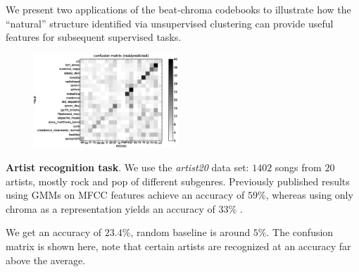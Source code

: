 \documentclass[landscape,a0b,final]{a0poster}
\newenvironment{poster}{
  \begin{center}
  \begin{minipage}[c]{0.98\textwidth}
}{
  \end{minipage} 
  \end{center}
}
\newcommand{\pbox}[4]{
\psshadowbox[#3]{
\begin{minipage}[t][#2][t]{#1}
#4
\end{minipage}
}}
\begin{document}
\begin{poster}
\begin{multicols}{3}
\newpage


\vspace{2cm}
\begin{center}
  \pbox{0.8\columnwidth}{}{linewidth=2mm,framearc=0.1,linecolor=lightred,fillstyle=gradient,gradangle=0,gradbegin=white,gradend=whitepink,gradmidpoint=1.0,framesep=1em}{
    \begin{center}
      \large Experiments
    \end{center}}
\end{center}

\vspace{4.0cm}

\begin{minipage}[c][9cm][c]{\columnwidth}

We present two applications of the beat-chroma codebooks
to illustrate how the ``natural'' structure identified via 
unsupervised clustering can provide useful 
features for subsequent supervised tasks.
\vspace{1cm}

\begin{figure}
  \vspace{-20pt}
  \begin{center}
    \includegraphics[width=0.48\textwidth]{conf_mat_per_artist.ps}
  \end{center}
  \vspace{-20pt}
\end{figure}

\textbf{Artist recognition task}.
We use the {\it artist20} data set: $1402$ songs from $20$ artists, 
mostly rock and pop of different subgenres.  
Previously published results using GMMs on MFCC features achieve an 
accuracy of $59\%$, whereas using only chroma as a representation yields an
accuracy of $33\%$  \cite{Ellis2007}.

We get an accuracy of $\mathbf{23.4\%}$, random baseline 
is around $5\%$. 
The confusion matrix is shown here, note 
that certain artists are recognized at an accuracy far above the average.


\end{minipage}
\end{multicols}
\end{poster}
\end{document}
